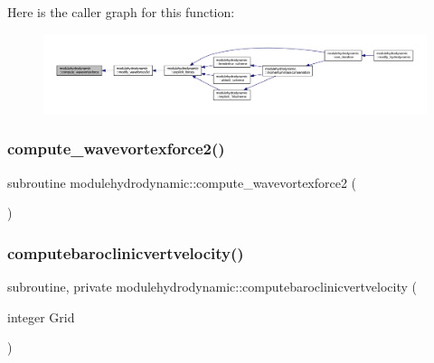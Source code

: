 Here is the caller graph for this function\+:\nopagebreak
\begin{figure}[H]
\begin{center}
\leavevmode
\includegraphics[width=350pt]{namespacemodulehydrodynamic_a97eb0405fb1ce63e0caa5f1180b47593_icgraph}
\end{center}
\end{figure}
\mbox{\label{namespacemodulehydrodynamic_a933fb31998f4ab5c221e487b96209deb}} 
\subsubsection{\texorpdfstring{compute\+\_\+wavevortexforce2()}{compute\_wavevortexforce2()}}
{\footnotesize\ttfamily subroutine modulehydrodynamic\+::compute\+\_\+wavevortexforce2 (\begin{DoxyParamCaption}{ }\end{DoxyParamCaption})\hspace{0.3cm}{\ttfamily [private]}}

\mbox{\label{namespacemodulehydrodynamic_a1d49415947b89ef0be84e9bdfbad90a0}} 
\subsubsection{\texorpdfstring{computebaroclinicvertvelocity()}{computebaroclinicvertvelocity()}}
{\footnotesize\ttfamily subroutine, private modulehydrodynamic\+::computebaroclinicvertvelocity (\begin{DoxyParamCaption}\item[{integer}]{Grid }\end{DoxyParamCaption})\hspace{0.3cm}{\ttfamily [private]}}

